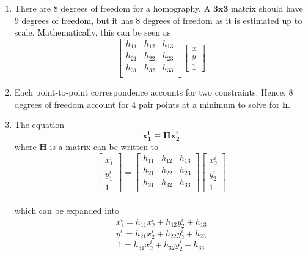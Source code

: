 \documentclass[12pt,letterpaper, onecolumn]{exam}
\begin{document}
\begin{questions}
    \begin{solution}
        \begin{enumerate}
            \item There are 8 degrees of freedom for a homography.
            A \(\mathbf{3x3}\) matrix should have 9 degrees of freedom, but it has 8 degrees of freedom as it is estimated up to scale. Mathematically, this can be seen as 
            \[
                \begin{bmatrix} h_{11} & h_{12} & h_{13} \\ h_{21} & h_{22} & h_{23} \\ h_{31} & h_{32} & h_{33} \\ \end{bmatrix}
                \begin{bmatrix} x \\ y \\ 1 \end{bmatrix}
            \]
            \item Each point-to-point correspondence accounts for two constraints. Hence, 8 degrees of freedom account for 4 pair points at a minimum to solve for \(\mathbf{h}\).
            \item The equation
            \[
                \mathbf{x_1^i} \equiv \mathbf{H} \mathbf{x_2^i} 
            \]
            where \(\mathbf{H}\) is a matrix can be written to
            \\
            \[
                \begin{bmatrix} x_1^i \\ y_1^i \\ 1 \end{bmatrix} = \begin{bmatrix} h_{11} & h_{12} & h_{13} \\ h_{21} & h_{22} & h_{23} \\ h_{31} & h_{32} & h_{33} \\ \end{bmatrix} \begin{bmatrix} x_2^i \\ y_2^i \\ 1 \end{bmatrix} 
            \]
            \\
            which can be expanded into
            \[
                x_1^i = h_{11}x_2^i + h_{12}y_2^i + h_{13}
            \]
            \[
                y_1^i = h_{21}x_2^i + h_{22}y_2^i + h_{23}
            \]
            \[
                1 = h_{31}x_2^i + h_{32}y_2^i + h_{33}
\]
\end{enumerate}
\end{solution}
\end{questions}
\end{document}
